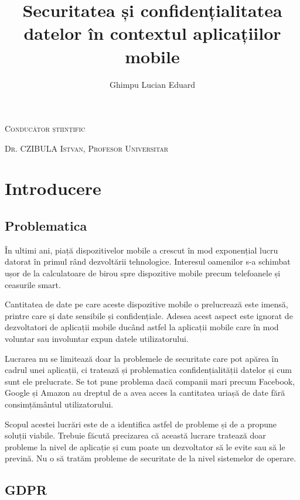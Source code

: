 \documentclass[12pt]{article}
\begin{document}
\title{Securitatea și confidențialitatea datelor în contextul aplicațiilor mobile}

\author{Ghimpu Lucian Eduard}
\maketitle

\textsc{Conducător științific}

\textsc{Dr. CZIBULA Istvan, Profesor Universitar}

\newpage

\tableofcontents

\newpage
\section{Introducere}
\subsection{Problematica}

În ultimi ani, piață dispozitivelor mobile a crescut în mod exponențial lucru datorat în primul
rând dezvoltării tehnologice. Interesul oamenilor s-a schimbat ușor de la calculatoare de birou spre 
dispozitive mobile precum telefoanele și ceasurile smart. 

Cantitatea de date pe care aceste dispozitive mobile o prelucrează este imensă, printre care și date sensibile
și confidențiale. Adesea acest aspect este ignorat de dezvoltatori de aplicații mobile ducând astfel
la aplicații mobile care în mod voluntar sau involuntar expun datele utilizatorului. 

Lucrarea nu se limitează doar la problemele de securitate care pot apărea în cadrul unei aplicații, ci 
tratează și problematica confidențialității datelor și cum sunt ele prelucrate. Se tot pune problema dacă companii mari precum Facebook, Google și Amazon au dreptul de a avea acces la
cantitatea uriașă de date fără consimțământul utilizatorului.

Scopul acestei lucrări este de a identifica astfel de probleme și de a propune soluții viabile.
Trebuie făcută precizarea că această lucrare tratează doar probleme la nivel de aplicație și cum poate
un dezvoltator să le evite sau să le prevină. Nu o să tratăm probleme de securitate de la nivel sistemelor
de operare.

\newpage
\subsection{GDPR}
\end{document}
